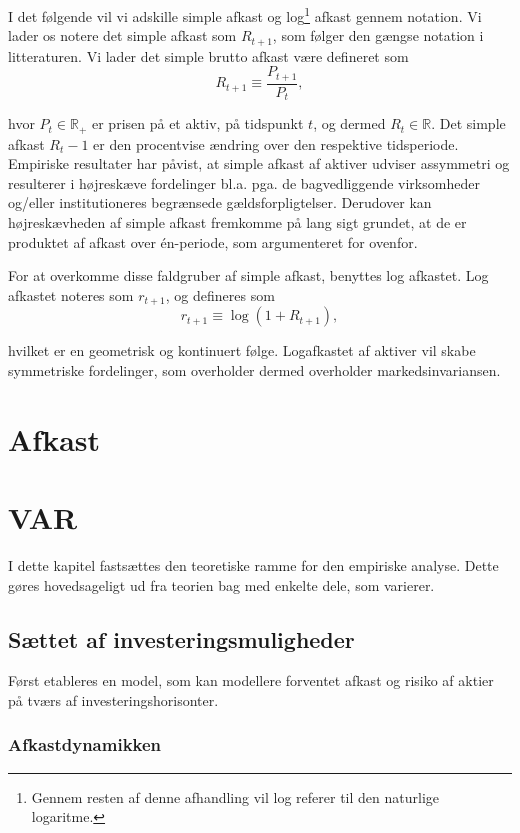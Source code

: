 \documentclass[
  a4paper,
  oneside]{memoir}
\begin{document}
I det følgende vil vi adskille simple afkast og log\footnote{Gennem resten af denne afhandling vil log referer til den naturlige logaritme.} afkast gennem notation. Vi lader os notere det simple afkast som \(R_{t+1}\), som følger den gængse notation i litteraturen. Vi lader det simple brutto afkast være defineret som
\[R_{t+1}\equiv\frac{P_{t+1}}{P_t},\]

hvor \(P_t\in\mathbb{R}_+\) er prisen på et aktiv, på tidspunkt \(t\), og dermed \(R_t\in\mathbb{R}\). Det simple afkast \(R_t-1\) er den procentvise ændring over den respektive tidsperiode. Empiriske resultater har påvist, at simple afkast af aktiver udviser assymmetri og resulterer i højreskæve fordelinger bl.a. pga. de bagvedliggende virksomheder og/eller institutioneres begrænsede gældsforpligtelser. Derudover kan højreskævheden af simple afkast fremkomme på lang sigt grundet, at de er produktet af afkast over én-periode, som argumenteret for ovenfor.

For at overkomme disse faldgruber af simple afkast, benyttes log afkastet. Log afkastet noteres som \(r_{t+1}\), og defineres som
\[r_{t+1}\equiv\log(1+R_{t+1}),\]

hvilket er en geometrisk og kontinuert følge. Logafkastet af aktiver vil skabe symmetriske fordelinger, som overholder dermed overholder markedsinvariansen.

\hypertarget{afkast}{%
\chapter{Afkast}\label{afkast}}

\hypertarget{var}{%
\chapter{VAR}\label{var}}

I dette kapitel fastsættes den teoretiske ramme for den empiriske analyse. Dette gøres hovedsageligt ud fra teorien bag \citep{Userguide2004} med enkelte dele, som varierer.

\section{Sættet af investeringsmuligheder}

Først etableres en model, som kan modellere forventet afkast og risiko af aktier på tværs af investeringshorisonter.

\subsection{Afkastdynamikken}
\end{document}
